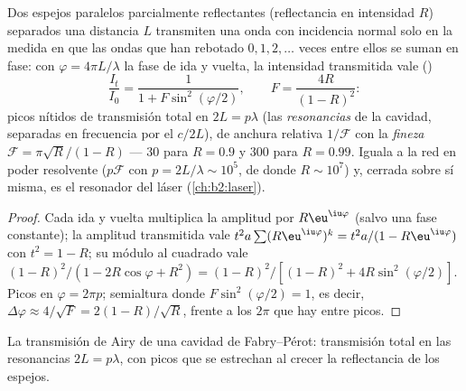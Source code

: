 \begin{proposition}\label{prop:b2:gratings:fabryperot}
Dos espejos paralelos parcialmente reflectantes (reflectancia en intensidad $R$)
separados una distancia $L$ transmiten una onda con incidencia normal solo en la medida
en que las ondas que han rebotado $0, 1, 2, \dots$ veces entre ellos se suman
en fase: con $\varphi = 4\pi L/\lambda$ la fase de ida y vuelta, la intensidad
transmitida vale ()
\[
\frac{I_t}{I_0} = \frac1{1 + F\sin^2(\varphi/2)} , \qquad F = \frac{4R}{(1 - R)^2} :
\]
picos nítidos de transmisión total en $2L = p\lambda$ (las \emph{resonancias}
de la cavidad, separadas en frecuencia por el \emph{}
$c/2L$), de anchura relativa $1/\mathcal F$ con la \emph{fineza} $\mathcal F = \pi
\sqrt R/(1 - R)$ --- $30$ para $R = 0.9$ y $300$ para $R = 0.99$. Iguala a la red
en poder resolvente ($p\mathcal F$ con $p = 2L/\lambda \sim 10^5$, de donde $R \sim
10^7$) y, cerrada sobre sí misma, es el resonador del láser
(\cref{ch:b2:laser}).
\end{proposition}

\begin{proof}
Cada ida y vuelta multiplica la amplitud por $R\eu^{\iu\varphi}$ (salvo una
fase constante); la amplitud transmitida vale $t^2a\sum(R\eu^{\iu\varphi})^k =
t^2a/(1 - R\eu^{\iu\varphi})$ con $t^2 = 1 - R$; su módulo al cuadrado vale $(1 - R)^2/
(1 - 2R\cos\varphi + R^2) = (1 - R)^2/[(1 - R)^2 + 4R\sin^2(\varphi/2)]$. Picos en
$\varphi = 2\pi p$; semialtura donde $F\sin^2(\varphi/2) = 1$, es decir, $\Delta\varphi \approx
4/\sqrt F = 2(1 - R)/\sqrt R$, frente a los $2\pi$ que hay entre picos.
\end{proof}

\begin{omfigure}

{\small La transmisión de Airy de una cavidad de Fabry--Pérot: transmisión
total en las resonancias $2L = p\lambda$, con picos que se estrechan al crecer
la reflectancia de los espejos.}
\end{omfigure}

